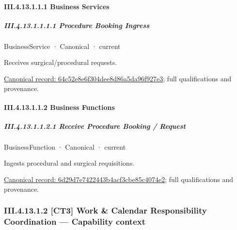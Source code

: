 \paragraph*{III.4.13.1.1.1 Business Services}
\label{navigation:III.4.13.1.1.1}

\subparagraph*{III.4.13.1.1.1.1 Procedure Booking Ingress}
\label{navigation:III.4.13.1.1.1.1}

\label{element:64c52e8e6f304dee8d86a5da96f927e3}
{\small BusinessService · Canonical · current}\par

Receives surgical/procedural requests.


{\footnotesize \href{../../../../continuum/business/business-service/64c52e8e6f304dee8d86a5da96f927e3.md}{Canonical record: 64c52e8e6f304dee8d86a5da96f927e3}; full qualifications and provenance.}\par
\paragraph*{III.4.13.1.1.2 Business Functions}
\label{navigation:III.4.13.1.1.2}

\subparagraph*{III.4.13.1.1.2.1 Receive Procedure Booking / Request}
\label{navigation:III.4.13.1.1.2.1}

\label{element:6d29d7e7422443b4acf3cbe85c4074e2}
{\small BusinessFunction · Canonical · current}\par

Ingests procedural and surgical requisitions.


{\footnotesize \href{../../../../continuum/business/business-function/6d29d7e7422443b4acf3cbe85c4074e2.md}{Canonical record: 6d29d7e7422443b4acf3cbe85c4074e2}; full qualifications and provenance.}\par
\subsubsection*{III.4.13.1.2 [CT3] Work \& Calendar Responsibility Coordination — Capability context}
\label{navigation:III.4.13.1.2}

